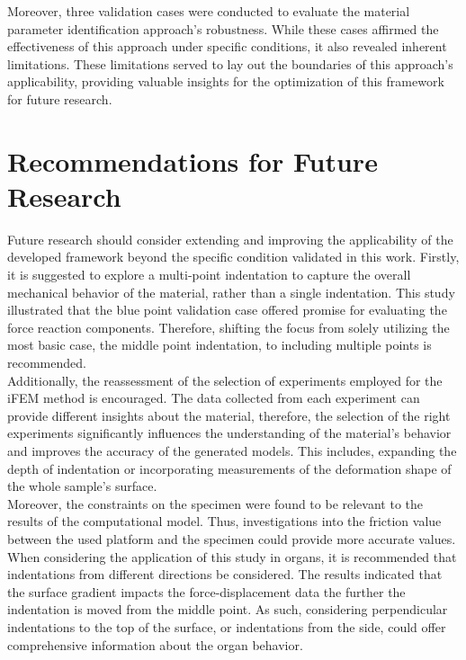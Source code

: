 Moreover, three validation cases were conducted to evaluate the material parameter identification 
approach's robustness. While these cases affirmed the effectiveness of this approach under 
specific conditions, it also revealed inherent limitations. These limitations served to 
lay out the boundaries of this approach's applicability, providing valuable insights for the 
optimization of this framework for future research.

\section{Recommendations for Future Research}
Future research should consider extending and improving the applicability of the developed 
framework beyond the specific condition validated in this work. Firstly, it is suggested to explore 
a multi-point indentation to capture the overall mechanical behavior of the material, rather than a 
single indentation. This study illustrated that the blue point validation case offered promise 
for evaluating the force reaction components. Therefore, shifting the focus from solely utilizing 
the most basic case, the middle point indentation, to including multiple points is recommended.\\

Additionally, the reassessment of the selection of experiments employed for the iFEM method is 
encouraged. The data collected from each experiment can provide different insights about the material, therefore, 
the selection of the right experiments significantly influences the understanding of the material's behavior and 
improves the accuracy of the generated models. This includes, expanding the depth of indentation or incorporating 
measurements of the deformation shape of the whole sample's surface.\\

Moreover, the constraints on the specimen were found to be relevant to the results of the computational model.
Thus, investigations into the friction value between the used platform and the specimen could 
provide more accurate values.\\

When considering the application of this study in organs, it is recommended that indentations from 
different directions be considered. The results indicated that the surface gradient impacts the force-displacement data the
further the indentation is moved from the middle point. As such, considering perpendicular indentations to the top 
of the surface, or indentations from the side, could offer comprehensive information about the organ behavior.\\

